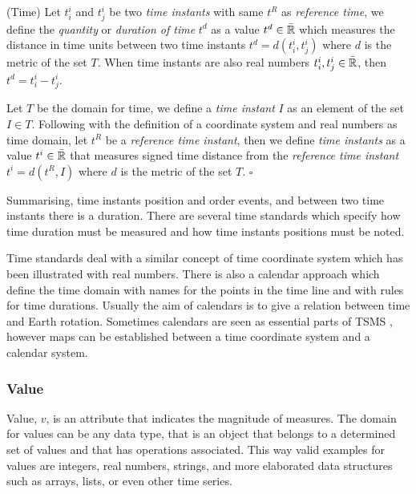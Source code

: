 \begin{definition}(Time)
  \label{def:model:temps}
  Let $t^i_i$ and $t^i_j$ be two \emph{time instants} with same $t^R$
  as \emph{reference time}, we define the \emph{quantity} or
  \emph{duration of time} $t^d$ as a value $t^d \in\bar{\mathbb{R}}$ which measures
  the distance in time units between two time instants $t^d =
  d(t^i_i,t^i_j)$ where $d$ is the metric of the set $T$. When time
  instants are also real numbers $t^i_i , t^i_j \in \bar{\mathbb{R}}$, then $t^d =
  t^i_i - t^i_j$.

  Let $T$ be the domain for time, we define a \emph{time instant} $I$
  as an element of the set $I \in T$. Following with the definition of
  a coordinate system and real numbers as time domain, let $t^{R}$ be
  a \emph{reference time instant}, then we define \emph{time instants}
  as a value $t^i \in\bar{\mathbb{R}}$ that measures signed time distance from the
  \emph{reference time instant} $t^i= d(t^{R},I)$ where $d$ is the
  metric of the set $T$. $\square$
\end{definition}

Summarising, time instants position and order events, and between two
time instants there is a duration.  There are several time standards
\cite{allen:timescales} which specify how time duration must be
measured and how time instants positions must be noted.

Time standards deal with a similar concept of time coordinate system
which has been illustrated with real numbers. There is also a calendar
approach which define the time domain with names for the points in the
time line and with rules for time durations. Usually the aim of
calendars is to give a relation between time and Earth
rotation. Sometimes calendars are seen as essential parts of TSMS
\cite{dreyer94}, however maps can be established between a time
coordinate system and a calendar system.



\subsubsection{Value}

Value, $v$, is an attribute that indicates the magnitude of measures. The
domain for values can be any data type, that is an object that belongs
to a determined set of values and that has operations associated.
This way valid examples for values are integers, real numbers,
strings, and more elaborated data structures such as arrays, lists, or
even other time series.

